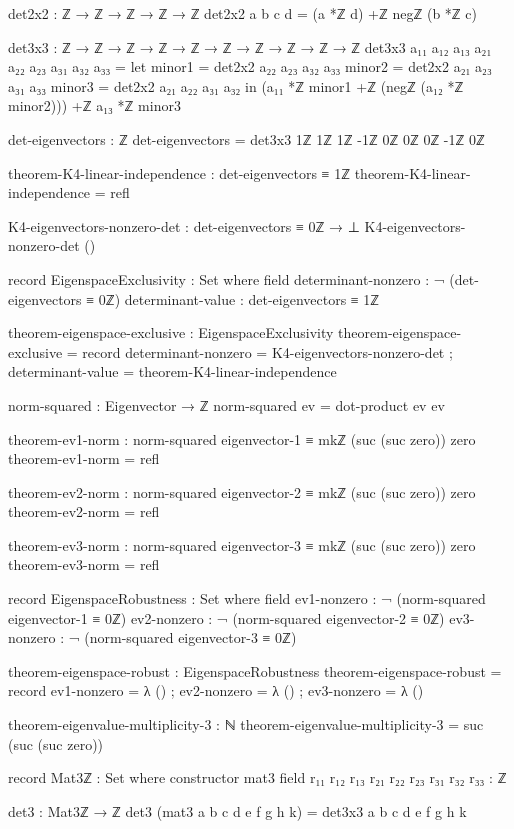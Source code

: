 \documentclass[11pt,a4paper]{book}
\begin{document}
\begin{code}
det2x2 : ℤ → ℤ → ℤ → ℤ → ℤ
det2x2 a b c d = (a *ℤ d) +ℤ negℤ (b *ℤ c)

det3x3 : ℤ → ℤ → ℤ → ℤ → ℤ → ℤ → ℤ → ℤ → ℤ → ℤ
det3x3 a₁₁ a₁₂ a₁₃ a₂₁ a₂₂ a₂₃ a₃₁ a₃₂ a₃₃ =
  let minor1 = det2x2 a₂₂ a₂₃ a₃₂ a₃₃
      minor2 = det2x2 a₂₁ a₂₃ a₃₁ a₃₃
      minor3 = det2x2 a₂₁ a₂₂ a₃₁ a₃₂
  in (a₁₁ *ℤ minor1 +ℤ (negℤ (a₁₂ *ℤ minor2))) +ℤ a₁₃ *ℤ minor3

det-eigenvectors : ℤ
det-eigenvectors = det3x3 
  1ℤ 1ℤ 1ℤ
  -1ℤ 0ℤ 0ℤ
  0ℤ -1ℤ 0ℤ

theorem-K4-linear-independence : det-eigenvectors ≡ 1ℤ
theorem-K4-linear-independence = refl

K4-eigenvectors-nonzero-det : det-eigenvectors ≡ 0ℤ → ⊥
K4-eigenvectors-nonzero-det ()

record EigenspaceExclusivity : Set where
  field
    determinant-nonzero : ¬ (det-eigenvectors ≡ 0ℤ)
    determinant-value   : det-eigenvectors ≡ 1ℤ

theorem-eigenspace-exclusive : EigenspaceExclusivity
theorem-eigenspace-exclusive = record
  { determinant-nonzero = K4-eigenvectors-nonzero-det
  ; determinant-value = theorem-K4-linear-independence
  }

norm-squared : Eigenvector → ℤ
norm-squared ev = dot-product ev ev

theorem-ev1-norm : norm-squared eigenvector-1 ≡ mkℤ (suc (suc zero)) zero
theorem-ev1-norm = refl

theorem-ev2-norm : norm-squared eigenvector-2 ≡ mkℤ (suc (suc zero)) zero
theorem-ev2-norm = refl

theorem-ev3-norm : norm-squared eigenvector-3 ≡ mkℤ (suc (suc zero)) zero
theorem-ev3-norm = refl

record EigenspaceRobustness : Set where
  field
    ev1-nonzero : ¬ (norm-squared eigenvector-1 ≡ 0ℤ)
    ev2-nonzero : ¬ (norm-squared eigenvector-2 ≡ 0ℤ)
    ev3-nonzero : ¬ (norm-squared eigenvector-3 ≡ 0ℤ)

theorem-eigenspace-robust : EigenspaceRobustness
theorem-eigenspace-robust = record
  { ev1-nonzero = λ ()
  ; ev2-nonzero = λ ()
  ; ev3-nonzero = λ ()
  }

theorem-eigenvalue-multiplicity-3 : ℕ
theorem-eigenvalue-multiplicity-3 = suc (suc (suc zero))

record Mat3ℤ : Set where
  constructor mat3
  field
    r₁₁ r₁₂ r₁₃ r₂₁ r₂₂ r₂₃ r₃₁ r₃₂ r₃₃ : ℤ

det3 : Mat3ℤ → ℤ
det3 (mat3 a b c d e f g h k) = det3x3 a b c d e f g h k


\end{code}
\end{document}
